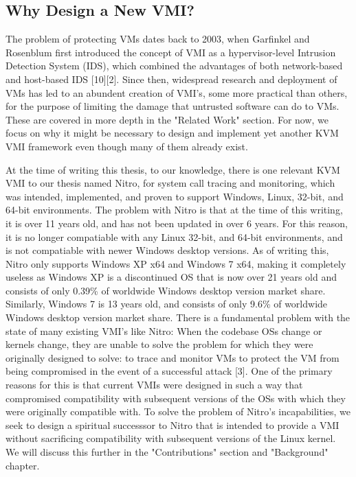 \documentclass{report}
\begin{document}
\begin{spacing}{1.5}
\subsection{Why Design a New VMI?}

{\large
The problem of protecting VMs dates back to 2003, when Garfinkel and Rosenblum first introduced the concept of VMI as a hypervisor-level Intrusion Detection System (IDS), which combined the advantages of both network-based and host-based IDS [10][2]. Since then, widespread research and deployment of VMs has led to an abundent creation of VMI's, some more practical than others, for the purpose of limiting the damage that untrusted software can do to VMs. These are covered in more depth in the "Related Work" section. For now, we focus on why it might be necessary to design and implement yet another KVM VMI framework even though many of them already exist.
\newline
}


{\large
At the time of writing this thesis, to our knowledge, there is one relevant KVM VMI to our thesis named Nitro, for system call tracing and monitoring, which was intended, implemented, and proven to support Windows, Linux, 32-bit, and 64-bit environments. The problem with Nitro is that at the time of this writing, it is over 11 years old, and has not been updated in over 6 years. For this reason, it is no longer compatiable with any Linux 32-bit, and 64-bit environments, and is not compatiable with newer Windows desktop versions. As of writing this, Nitro only supports Windows XP x64 and Windows 7 x64, making it completely useless as Windows XP is a discontinued OS that is now over 21 years old and consists of only 0.39\% of worldwide Windows desktop version market share. Similarly, Windows 7 is 13 years old, and consists of only 9.6\% of worldwide Windows desktop version market share. There is a fundamental problem with the state of many existing VMI's like Nitro: When the codebase OSs change or kernels change, they are unable to solve the problem for which they were originally designed to solve: to trace and monitor VMs to protect the VM from being compromised in the event of a successful attack [3]. One of the primary reasons for this is that current VMIs were designed in such a way that compromised compatibility with subsequent versions of the OSs with which they were originally compatible with. To solve the problem of Nitro's incapabilities, we seek to design a spiritual successsor to Nitro that is intended to provide a VMI without sacrificing compatibility with subsequent versions of the Linux kernel. We will discuss this further in the "Contributions" section and "Background" chapter.
\newline
}













\end{spacing}
\end{document}
